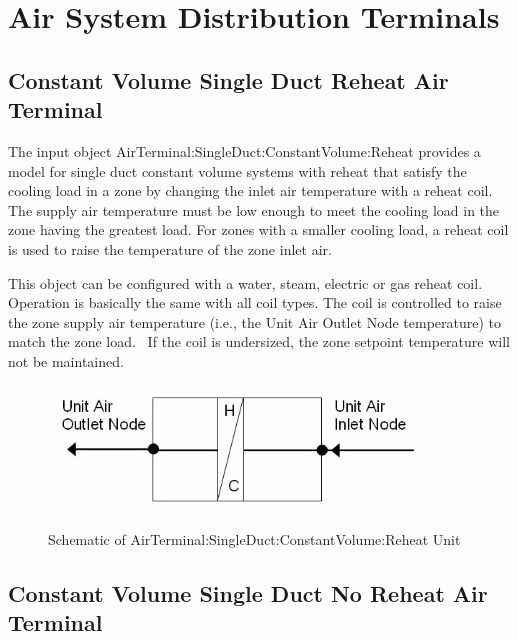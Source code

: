 \section{Air System Distribution Terminals }\label{air-system-distribution-terminals}

\subsection{Constant Volume Single Duct Reheat Air Terminal}\label{constant-volume-single-duct-reheat-air-terminal}

The input object AirTerminal:SingleDuct:ConstantVolume:Reheat provides a model for single duct constant volume systems with reheat that satisfy the cooling load in a zone by changing the inlet air temperature with a reheat coil. The supply air temperature must be low enough to meet the cooling load in the zone having the greatest load. For zones with a smaller cooling load, a reheat coil is used to raise the temperature of the zone inlet air.

This object can be configured with a water, steam, electric or gas reheat coil. Operation is basically the same with all coil types. The coil is controlled to raise the zone supply air temperature (i.e., the Unit Air Outlet Node temperature) to match the zone load.~ If the coil is undersized, the zone setpoint temperature will not be maintained.

\begin{figure}[hbtp] %
\centering
\includegraphics[width=0.9\textwidth, height=0.9\textheight, keepaspectratio=true]{media/image2788.png}
\caption{Schematic of AirTerminal:SingleDuct:ConstantVolume:Reheat Unit \protect \label{fig:schematic-of-airterminal-singleduct1}}
\end{figure}


\subsection{Constant Volume Single Duct No Reheat Air Terminal}\label{constant-volume-single-duct-no-reheat-air-terminal}

